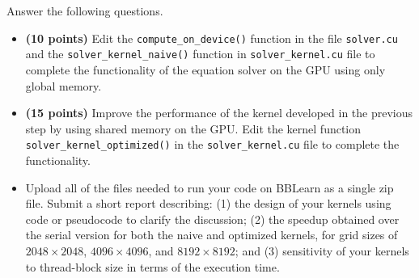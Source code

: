 \documentclass[12pt]{article}
\begin{document}
Answer the following questions. 
\begin{itemize}
\item \textbf{(10 points)} Edit the \texttt{compute\_on\_device()} function in the file \texttt{solver.cu} and the \texttt{solver\_kernel\_naive()} function in \texttt{solver\_kernel.cu} file to complete the functionality of the equation solver on the GPU using only global memory.
    
\item \textbf{(15 points)} Improve the performance of the kernel developed in the previous step by using shared memory on the GPU. Edit the kernel function \texttt{solver\_kernel\_optimized()} in the \texttt{solver\_kernel.cu} file to complete the functionality.

\item Upload all of the files needed to run your code on BBLearn as a single zip file. Submit a short report describing: (1) the design of your kernels using code or pseudocode to clarify the discussion; (2) the speedup obtained over the serial version for both the naive and optimized kernels, for grid sizes of $2048 \times 2048$, $4096 \times 4096$, and $8192 \times 8192$; and (3) sensitivity of your kernels to thread-block size in terms of the execution time.
\end{itemize}
\end{document}
